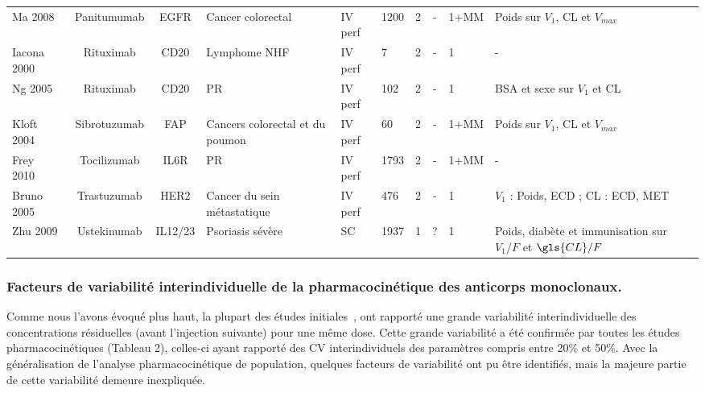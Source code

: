\begin{table}[!ht]
\begin{tabular}{p{1.6cm}ccp{1.8cm}p{.8cm}p{.9cm}ccp{.9cm}l}
      Ma 2008~\citep{REF73} & Panitumumab & EGFR & Cancer colorectal & \gls{IV} perf & 1200 & 2 & - & 1+MM & Poids sur $V_1$, \gls{CL} et $V_{max}$ \\
      Iacona 2000~\citep{REF51} & Rituximab & CD20 & Lymphome NHF & \gls{IV} perf & 7 & 2 & - & 1 & - \\
      Ng 2005~\citep{REF52} & Rituximab & CD20 & PR & \gls{IV} perf & 102 & 2 & - & 1 & BSA et sexe sur $V_1$ et \gls{CL} \\
      Kloft 2004~\citep{REF74} & Sibrotuzumab & FAP & Cancers colorectal et du poumon & \gls{IV} perf & 60 & 2 & - & 1+MM & Poids sur $V_1$,  \gls{CL} et $V_{max}$ \\
      Frey 2010~\citep{REF75} & Tocilizumab & IL6R & PR & \gls{IV} perf & 1793 & 2 & - & 1+MM & - \\
      Bruno 2005~\citep{REF76} & Trastuzumab & HER2 & Cancer du sein métastatique & \gls{IV} perf & 476 & 2 & - & 1 & $V_1$ : Poids, ECD ; \gls{CL} : ECD, MET \\
      Zhu 2009~\citep{REF77} & Ustekinumab & IL12/23 & Psoriasis sévère & SC & 1937 & 1 & ? & 1 & Poids, diabète et immunisation sur $V_1/F$ et $\gls{CL}/F$ \\
      \hline
    \end{tabular}
  \label{tab:2}
\end{table}

\subsubsection{Facteurs de variabilité interindividuelle de la pharmacocinétique des anticorps monoclonaux.}
Comme nous l'avons évoqué plus haut, la plupart des études initiales~\citep{REF53, REF54, REF58, REF60}, ont rapporté une grande variabilité interindividuelle des concentrations résiduelles (avant l'injection suivante) pour une même dose. Cette grande variabilité a été confirmée par toutes les études pharmacocinétiques (Tableau 2), celles-ci ayant rapporté des CV interindividuels des paramètres compris entre 20\% et 50\%. Avec la généralisation de l'analyse pharmacocinétique de population, quelques facteurs de variabilité ont pu être identifiés, mais la majeure partie de cette variabilité demeure inexpliquée.
